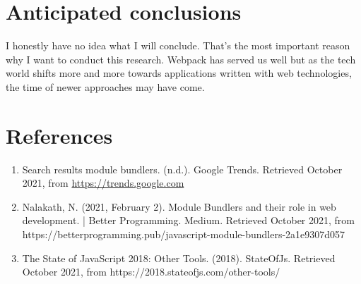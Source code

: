 \section{Anticipated conclusions}
\label{sec:verwachte_conclusies}

I honestly have no idea what I will conclude. That's the most important reason why I want to conduct this research. Webpack has served us well but as the tech world shifts more and more towards applications written with web technologies, the time of newer approaches may have come.

\section{References}
\label{sec:references}

\begin{enumerate}
    \item Search results module bundlers. (n.d.). Google Trends. Retrieved October 2021, from \href{https://trends.google.com/trends/explore?date=all&geo=BE&q=\%2Fg\%2F11clg_kyfc,\%2Fm\%2F02qkmx0,\%2Fm\%2F012ccfhw}{https://trends.google.com}
    \item Nalakath, N. (2021, February 2). Module Bundlers and their role in web development. | Better Programming. Medium. Retrieved October 2021, from https://betterprogramming.pub/javascript-module-bundlers-2a1e9307d057
    \item The State of JavaScript 2018: Other Tools. (2018). StateOfJs. Retrieved October 2021, from https://2018.stateofjs.com/other-tools/
\end{enumerate}

